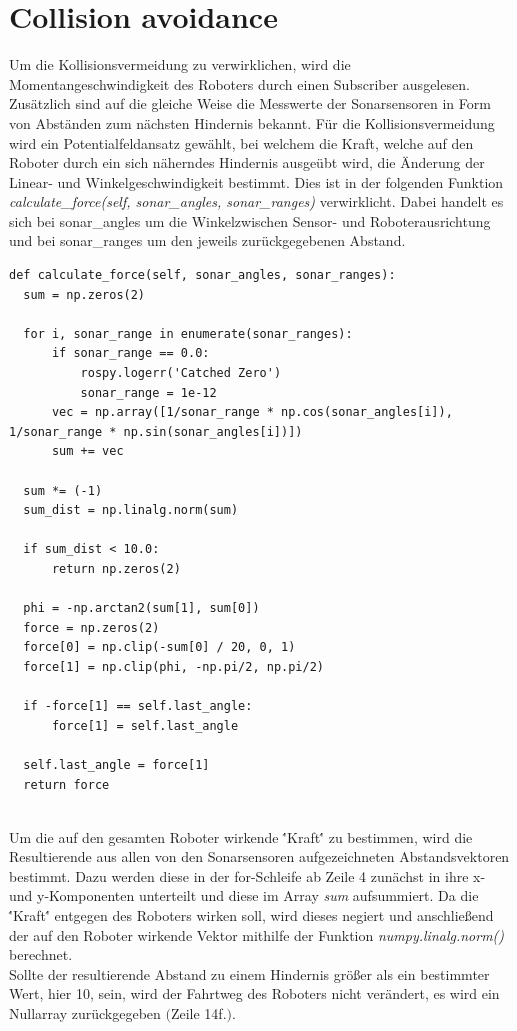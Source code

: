 \documentclass[12pt, a4paper]{report}
\begin{document}
\section{Collision avoidance}
Um die Kollisionsvermeidung zu verwirklichen, wird die Momentangeschwindigkeit des Roboters durch einen Subscriber ausgelesen. Zusätzlich sind auf die gleiche Weise die Messwerte der Sonarsensoren in Form von Abständen zum nächsten Hindernis bekannt.
Für die Kollisionsvermeidung wird ein Potentialfeldansatz gewählt, bei welchem die Kraft, welche auf den Roboter durch ein sich näherndes Hindernis ausgeübt wird, die Änderung der Linear- und Winkelgeschwindigkeit bestimmt. Dies ist in der folgenden Funktion \textit{calculate\_force(self, sonar\_angles, sonar\_ranges)} verwirklicht. Dabei handelt es sich bei sonar\_angles um die Winkelzwischen Sensor- und Roboterausrichtung und bei sonar\_ranges um den jeweils zurückgegebenen Abstand.
\begin{lstlisting}
def calculate_force(self, sonar_angles, sonar_ranges):
  sum = np.zeros(2)

  for i, sonar_range in enumerate(sonar_ranges):
      if sonar_range == 0.0:
          rospy.logerr('Catched Zero')
          sonar_range = 1e-12
      vec = np.array([1/sonar_range * np.cos(sonar_angles[i]), 1/sonar_range * np.sin(sonar_angles[i])])
      sum += vec
          
  sum *= (-1)
  sum_dist = np.linalg.norm(sum)
       
  if sum_dist < 10.0:
      return np.zeros(2)

  phi = -np.arctan2(sum[1], sum[0])
  force = np.zeros(2)
  force[0] = np.clip(-sum[0] / 20, 0, 1)
  force[1] = np.clip(phi, -np.pi/2, np.pi/2)

  if -force[1] == self.last_angle:
      force[1] = self.last_angle

  self.last_angle = force[1]
  return force
  
\end{lstlisting}
Um die auf den gesamten Roboter wirkende \''Kraft\'' zu bestimmen, wird die Resultierende aus allen von den Sonarsensoren aufgezeichneten Abstandsvektoren bestimmt. Dazu werden diese in der for-Schleife ab Zeile 4 zunächst in ihre x- und y-Komponenten unterteilt und diese im Array \textit{sum} aufsummiert. Da die \''Kraft\'' entgegen des Roboters wirken soll, wird dieses negiert und anschließend der auf den Roboter wirkende Vektor mithilfe der Funktion \textit{numpy.linalg.norm()} berechnet.\\
Sollte der resultierende Abstand zu einem Hindernis größer als ein bestimmter Wert, hier 10, sein, wird der Fahrtweg des Roboters nicht verändert, es wird ein Nullarray zurückgegeben $($Zeile 14f.$)$.\\
\end{document}
